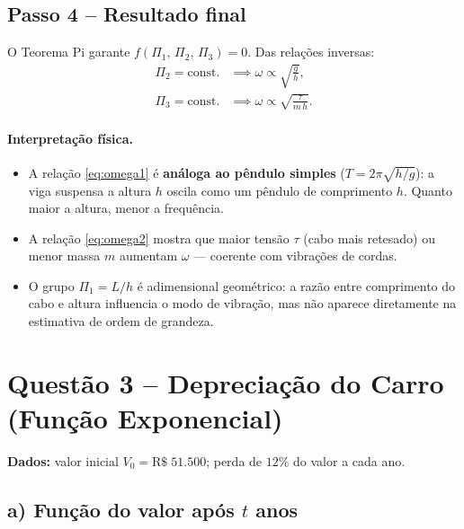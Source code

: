 \documentclass[12pt,a4paper]{article}
\theoremstyle{definition}
\begin{document}
\subsection{Passo 4 -- Resultado final}

O Teorema Pi garante $f(\Pi_1,\,\Pi_2,\,\Pi_3) = 0$.
Das rela\c{c}\~oes inversas:
\begin{align}
  \Pi_2 = \text{const.}
  &\implies \boxed{\omega \propto \sqrt{\frac{g}{h}}},
  \label{eq:omega1}\\[6pt]
  \Pi_3 = \text{const.}
  &\implies \boxed{\omega \propto \sqrt{\frac{\tau}{m\,h}}}.
  \label{eq:omega2}
\end{align}

\paragraph{Interpreta\c{c}\~ao f\'isica.}
\begin{itemize}
  \item A rela\c{c}\~ao \eqref{eq:omega1} \'e \textbf{an\'aloga ao p\^endulo simples}
    ($T = 2\pi\sqrt{h/g}$): a viga suspensa a altura $h$ oscila como um p\^endulo
    de comprimento $h$. Quanto maior a altura, menor a frequ\^encia.
  \item A rela\c{c}\~ao \eqref{eq:omega2} mostra que maior tens\~ao $\tau$
    (cabo mais retesado) ou menor massa $m$ aumentam $\omega$ --- coerente com
    vibrações de cordas.
  \item O grupo $\Pi_1 = L/h$ \'e adimensional geom\'etrico: a raz\~ao entre
    comprimento do cabo e altura influencia o modo de vibra\c{c}\~ao,
    mas n\~ao aparece diretamente na estimativa de ordem de grandeza.
\end{itemize}

\section{Quest\~ao 3 -- Deprecia\c{c}\~ao do Carro (Fun\c{c}\~ao Exponencial)}

\textbf{Dados:} valor inicial $V_0 = \text{R\$}\;51{.}500$; perda de $12\%$ do valor a cada ano.

\subsection{a) Fun\c{c}\~ao do valor ap\'os \texorpdfstring{$t$}{t} anos}
\end{document}
